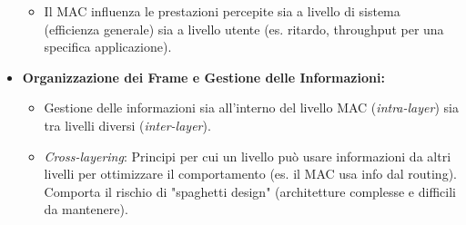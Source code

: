 \documentclass{article}
\begin{document}
\begin{itemize}
\begin{itemize}
        \item Il MAC influenza le prestazioni percepite sia a livello di sistema (efficienza generale) sia a livello utente (es. ritardo, throughput per una specifica applicazione).
    \end{itemize}
    \item \textbf{Organizzazione dei Frame e Gestione delle Informazioni:}
    \begin{itemize}
        \item Gestione delle informazioni sia all'interno del livello MAC (\textit{intra-layer}) sia tra livelli diversi (\textit{inter-layer}).
        \item \textit{Cross-layering}: Principi per cui un livello può usare informazioni da altri livelli per ottimizzare il comportamento (es. il MAC usa info dal routing). Comporta il rischio di "spaghetti design" (architetture complesse e difficili da mantenere).
    \end{itemize}
\end{itemize}
\end{document}
